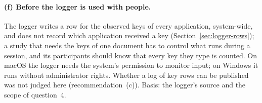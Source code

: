 \paragraph{(f) Before the logger is used with people.} The logger writes a row for the observed keys of every
application, system-wide, and does not record which application received a key (Section~\ref{sec:logger-rows}); a
study that needs the keys of one document has to control what runs during a session, and its participants should know
that every key they type is counted. On macOS the logger needs the system's permission to monitor input; on Windows it
runs without administrator rights. Whether a log of key rows can be published was not judged here (recommendation~(c)).
Basis: the logger's source and the scope of question~4.
